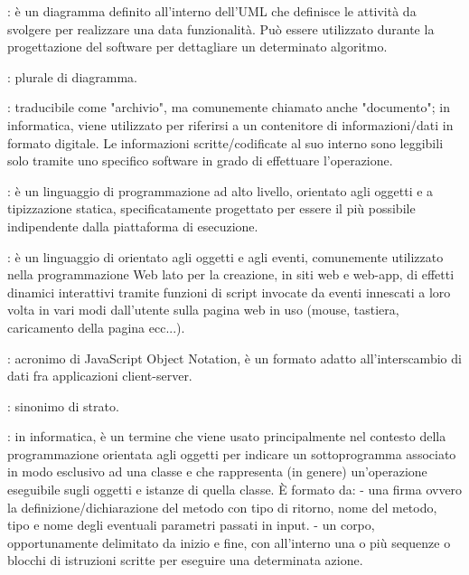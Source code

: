 {		  : è un diagramma definito all'interno dell’UML che definisce le attività da svolgere per realizzare una data funzionalità. Può essere utilizzato durante la progettazione del software per dettagliare un determinato algoritmo.
		  	
		: plurale di diagramma.

	
		: traducibile come "archivio", ma comunemente chiamato anche "documento"; in informatica, viene utilizzato per riferirsi a un contenitore di informazioni/dati in formato digitale. Le informazioni scritte/codificate al suo interno sono leggibili solo tramite uno specifico software in grado di effettuare l'operazione.
	
	
		: è un linguaggio di programmazione ad alto livello, orientato agli oggetti e a tipizzazione statica, specificatamente progettato per essere il più possibile indipendente dalla piattaforma di esecuzione.
	
		: è un linguaggio di  orientato agli oggetti e agli eventi, comunemente utilizzato nella programmazione Web lato  per la creazione, in siti web e web-app, di effetti dinamici interattivi tramite funzioni di script invocate da eventi innescati a loro volta in vari modi dall'utente sulla pagina web in uso (mouse, tastiera, caricamento della pagina ecc...).
	
		: acronimo di JavaScript Object Notation, è un formato adatto all'interscambio di dati fra applicazioni client-server.
	
	
		: sinonimo di strato.
	
	
		: in informatica, è un termine che viene usato principalmente nel contesto della programmazione orientata agli oggetti per indicare un sottoprogramma associato in modo esclusivo ad una classe e che rappresenta (in genere) un'operazione eseguibile sugli oggetti e istanze di quella classe. È formato da:
- una firma ovvero la definizione/dichiarazione del metodo con tipo di ritorno, nome del metodo, tipo e nome degli eventuali parametri passati in input.
- un corpo, opportunamente delimitato da inizio e fine, con all'interno una o più sequenze o blocchi di istruzioni scritte per eseguire una determinata azione.

}
